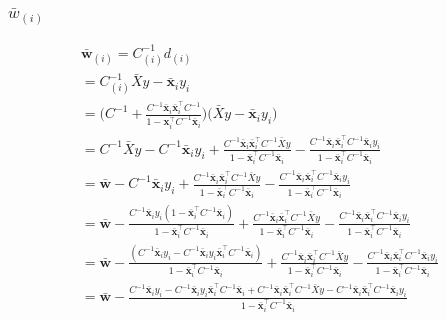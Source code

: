 \documentclass[11pt, oneside]{article}   	%
\begin{document}
\subsubsection{$\bar{w}_{(i)}$}
\begin{gather*}
\boldsymbol{\bar{w}}_{(i)} = C_{(i)}^{-1} d_{(i)}\\
= C_{(i)}^{-1} \bar{X}y - \boldsymbol{\bar{x}}_iy_i\\
= \bigg(C^{-1} + \frac{C^{-1} \boldsymbol{\bar{x}}_i \boldsymbol{\bar{x}}_i^\top C^{-1}}{1 - \boldsymbol{x}_i^\top C^{-1} \boldsymbol{\bar{x}}_i}\bigg) \bigg(\bar{X}y - \boldsymbol{\bar{x}}_iy_i\bigg)\\
= C^{-1}\bar{X}y - C^{-1}\boldsymbol{\bar{x}}_iy_i +  \frac{C^{-1} \boldsymbol{\bar{x}}_i \boldsymbol{\bar{x}}_i^\top C^{-1}\bar{X}y}{1 - \boldsymbol{\bar{x}}_i^\top C^{-1} \boldsymbol{\bar{x}}_i} - \frac{C^{-1} \boldsymbol{\bar{x}}_i \boldsymbol{\bar{x}}_i^\top C^{-1}\boldsymbol{\bar{x}}_iy_i}{1 - \boldsymbol{\bar{x}}_i^\top C^{-1} \boldsymbol{\bar{x}}_i}\\
= \boldsymbol{\bar{w}} - C^{-1}\boldsymbol{\bar{x}}_iy_i +  \frac{C^{-1} \boldsymbol{\bar{x}}_i \boldsymbol{\bar{x}}_i^\top C^{-1}\bar{X}y}{1 - \boldsymbol{\bar{x}}_i^\top C^{-1} \boldsymbol{\bar{x}}_i} - \frac{C^{-1} \boldsymbol{\bar{x}}_i \boldsymbol{\bar{x}}_i^\top C^{-1}\boldsymbol{\bar{x}}_iy_i}{1 - \boldsymbol{\bar{x}}_i^\top C^{-1} \boldsymbol{\bar{x}}_i}\\
=  \boldsymbol{\bar{w}} - \frac{C^{-1}\boldsymbol{\bar{x}}_iy_i(1 - \boldsymbol{\bar{x}}_i^\top C^{-1} \boldsymbol{\bar{x}}_i)}{1 - \boldsymbol{\bar{x}}_i^\top C^{-1} \boldsymbol{\bar{x}}_i} +  \frac{C^{-1} \boldsymbol{\bar{x}}_i \boldsymbol{\bar{x}}_i^\top C^{-1}\bar{X}y}{1 - \boldsymbol{\bar{x}}_i^\top C^{-1} \boldsymbol{\bar{x}}_i} - \frac{C^{-1} \boldsymbol{\bar{x}}_i \boldsymbol{\bar{x}}_i^\top C^{-1}\boldsymbol{\bar{x}}_iy_i}{1 - \boldsymbol{\bar{x}}_i^\top C^{-1} \boldsymbol{\bar{x}}_i}\\
= \boldsymbol{\bar{w}} - \frac{(C^{-1}\boldsymbol{\bar{x}}_iy_i - C^{-1}\boldsymbol{\bar{x}}_iy_i\boldsymbol{\bar{x}}_i^\top C^{-1} \boldsymbol{\bar{x}}_i)}{1 - \boldsymbol{\bar{x}}_i^\top C^{-1} \boldsymbol{\bar{x}}_i} +  \frac{C^{-1} \boldsymbol{\bar{x}}_i \boldsymbol{\bar{x}}_i^\top C^{-1}\bar{X}y}{1 - \boldsymbol{\bar{x}}_i^\top C^{-1} \boldsymbol{\bar{x}}_i} - \frac{C^{-1} \boldsymbol{\bar{x}}_i \boldsymbol{\bar{x}}_i^\top C^{-1}\boldsymbol{\bar{x}}_iy_i}{1 - \boldsymbol{\bar{x}}_i^\top C^{-1} \boldsymbol{\bar{x}}_i}\\
= \boldsymbol{\bar{w}} - \frac{C^{-1}\boldsymbol{\bar{x}}_iy_i - C^{-1}\boldsymbol{\bar{x}}_iy_i\boldsymbol{\bar{x}}_i^\top C^{-1} \boldsymbol{\bar{x}}_i + C^{-1} \boldsymbol{\bar{x}}_i \boldsymbol{\bar{x}}_i^\top C^{-1}\bar{X}y - C^{-1} \boldsymbol{\bar{x}}_i \boldsymbol{\bar{x}}_i^\top C^{-1}\boldsymbol{\bar{x}}_iy_i} {1 - \boldsymbol{\bar{x}}_i^\top C^{-1} \boldsymbol{\bar{x}}_i}\\

\end{gather*}
\end{document}
